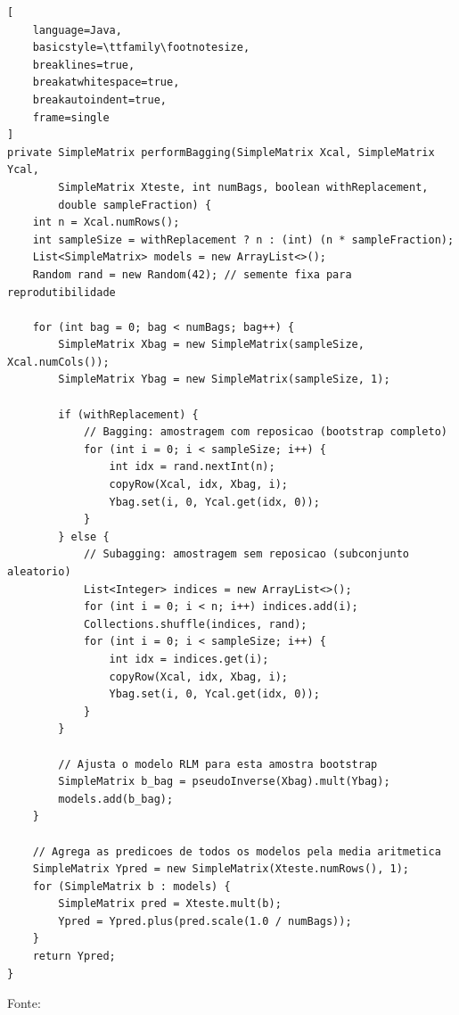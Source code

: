 \begin{center}
\label{lst:performbagging}
\end{center}
\vspace{-0.5\baselineskip}
\begin{lstlisting}[
    language=Java,
    basicstyle=\ttfamily\footnotesize,
    breaklines=true,
    breakatwhitespace=true,
    breakautoindent=true,
    frame=single
]
private SimpleMatrix performBagging(SimpleMatrix Xcal, SimpleMatrix Ycal,
        SimpleMatrix Xteste, int numBags, boolean withReplacement,
        double sampleFraction) {
    int n = Xcal.numRows();
    int sampleSize = withReplacement ? n : (int) (n * sampleFraction);
    List<SimpleMatrix> models = new ArrayList<>();
    Random rand = new Random(42); // semente fixa para reprodutibilidade

    for (int bag = 0; bag < numBags; bag++) {
        SimpleMatrix Xbag = new SimpleMatrix(sampleSize, Xcal.numCols());
        SimpleMatrix Ybag = new SimpleMatrix(sampleSize, 1);

        if (withReplacement) {
            // Bagging: amostragem com reposicao (bootstrap completo)
            for (int i = 0; i < sampleSize; i++) {
                int idx = rand.nextInt(n);
                copyRow(Xcal, idx, Xbag, i);
                Ybag.set(i, 0, Ycal.get(idx, 0));
            }
        } else {
            // Subagging: amostragem sem reposicao (subconjunto aleatorio)
            List<Integer> indices = new ArrayList<>();
            for (int i = 0; i < n; i++) indices.add(i);
            Collections.shuffle(indices, rand);
            for (int i = 0; i < sampleSize; i++) {
                int idx = indices.get(i);
                copyRow(Xcal, idx, Xbag, i);
                Ybag.set(i, 0, Ycal.get(idx, 0));
            }
        }

        // Ajusta o modelo RLM para esta amostra bootstrap
        SimpleMatrix b_bag = pseudoInverse(Xbag).mult(Ybag);
        models.add(b_bag);
    }

    // Agrega as predicoes de todos os modelos pela media aritmetica
    SimpleMatrix Ypred = new SimpleMatrix(Xteste.numRows(), 1);
    for (SimpleMatrix b : models) {
        SimpleMatrix pred = Xteste.mult(b);
        Ypred = Ypred.plus(pred.scale(1.0 / numBags));
    }
    return Ypred;
}
\end{lstlisting}
\begin{center}
\footnotesize Fonte: \oautor
\end{center}

